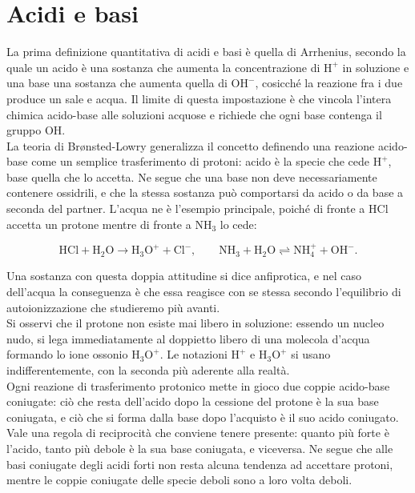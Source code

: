 \chapter{Acidi e basi}
 
La prima definizione quantitativa di acidi e basi è quella di Arrhenius, secondo la quale un acido è una sostanza che aumenta la concentrazione di $\mathrm{H^+}$ in soluzione e una base una sostanza che aumenta quella di $\mathrm{OH^-}$, cosicché la reazione fra i due produce un sale e acqua.
Il limite di questa impostazione è che vincola l'intera chimica acido-base alle soluzioni acquose e richiede che ogni base contenga il gruppo $\mathrm{OH}$.\\
 
La teoria di Br\o nsted-Lowry generalizza il concetto definendo una reazione acido-base come un semplice trasferimento di protoni: acido è la specie che cede $\mathrm{H^+}$, base quella che lo accetta.
Ne segue che una base non deve necessariamente contenere ossidrili, e che la stessa sostanza può comportarsi da acido o da base a seconda del partner.
L'acqua ne è l'esempio principale, poiché di fronte a $\mathrm{HCl}$ accetta un protone mentre di fronte a $\mathrm{NH_3}$ lo cede:

\begin{equation}
    \mathrm{HCl} + \mathrm{H_2O} \longrightarrow \mathrm{H_3O^+} + \mathrm{Cl^-} ,
    \qquad
    \mathrm{NH_3} + \mathrm{H_2O} \rightleftharpoons \mathrm{NH_4^+} + \mathrm{OH^-} .
    \label{eq:brønsted_esempi}
\end{equation}

Una sostanza con questa doppia attitudine si dice anfiprotica, e nel caso dell'acqua la conseguenza è che essa reagisce con se stessa secondo l'equilibrio di autoionizzazione che studieremo più avanti.\\
 
Si osservi che il protone non esiste mai libero in soluzione: essendo un nucleo nudo, si lega immediatamente al doppietto libero di una molecola d'acqua formando lo ione ossonio $\mathrm{H_3O^+}$.
Le notazioni $\mathrm{H^+}$ e $\mathrm{H_3O^+}$ si usano indifferentemente, con la seconda più aderente alla realtà.\\
 
Ogni reazione di trasferimento protonico mette in gioco due coppie acido-base coniugate: ciò che resta dell'acido dopo la cessione del protone è la sua base coniugata, e ciò che si forma dalla base dopo l'acquisto è il suo acido coniugato.
Vale una regola di reciprocità che conviene tenere presente: quanto più forte è l'acido, tanto più debole è la sua base coniugata, e viceversa.
Ne segue che alle basi coniugate degli acidi forti non resta alcuna tendenza ad accettare protoni, mentre le coppie coniugate delle specie deboli sono a loro volta deboli.
 
